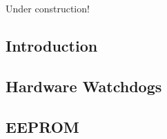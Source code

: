 \chapter{\csoczerolongtitle{}}

\label{csoc0}

                     {Under construction!}

\section{Introduction}


\section{Hardware Watchdogs}


\section{EEPROM}


